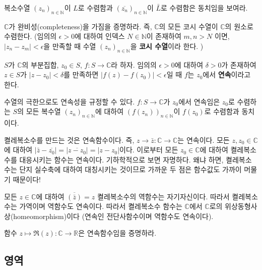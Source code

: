 \begin{salt_exercise} \label{ex-1-26}
복소수열 $(z_n)_{n\in\mathbb N}$이 $L$로 수렴함과
$(\overline{z_n})_{n\in\mathbb N}$이 $\bar L$로 수렴함은 동치임을 보여라.
\end{salt_exercise}

\begin{salt_exercise} \label{ex-1-27}
$\mathbb C$가 완비성(completeness)을 가짐을 증명하라.
즉, $\mathbb C$의 모든 코시 수열이 $\mathbb C$의 원소로 수렴한다.
(임의의 $\epsilon>0$에 대하여 인덱스 $N\in\mathbb N$이 존재하여
$m,n>N$ 이면, $|z_n - z_m| < \epsilon$을 만족할 때
수열 $(z_n)_{n\in\mathbb N}$을 {\bf 코시 수열}이라 한다.
)
\end{salt_exercise}

$S$가 $\mathbb C$의 부분집합, $z_0\in S$,  $f:S\to \mathbb C$라 하자.
임의의 $\epsilon>0$에 대하여 $\delta>0$가 존재하여
$z\in S$가 $|z-z_0|<\delta$를 만족하면 $|f(z)-f(z_0)|<\epsilon$일 때
$f$는 $z_0$에서 {\bf 연속}이라고 한다.

수열의 극한으로도 연속성을 규정할 수 있다.
$f:S\to\mathbb C$가 $z_0$에서 연속임은
$z_0$로 수렴하는 $S$의 모든 복수열 $(z_n)_{n\in\mathbb N}$에 대하여
$(f(z_n))_{n\in\mathbb N}$이 $f(z_0)$로 수렴함과 동치이다.

\begin{salt_example} \label{example-1-2}
켤레복소수를 만드는 것은 연속함수이다.
즉, $z\to\bar z: \mathbb C \to \mathbb C$는 연속이다.
모든 $z, z_0 \in \mathbb C$에 대하여
$|\bar z - \overline{z_0}| = |\overline{z-z_0}| = |z-z_0|$이다.
이로부터 모든 $z_0\in\mathbb C$에 대하여 켤레복소수를 대응시키는 함수는
연속이다. 기하학적으로 보면 자명하다. 왜냐 하면, 켤레복소수는 단지 실수축에 대하여 
대칭시키는 것이므로 가까운 두 점은 함수값도 가까이 머물기 때문이다!

모든 $z\in\mathbb C$에 대하여 $\overline{(\bar z)} = z$ 켤레복소수의
역함수는 자기자신이다. 따라서 켤레복소수는 가역이며 역함수도 연속이다.
따라서 켤레복소수 함수는 $\mathbb C$에서 $\mathbb C$로의 
위상동형사상(homeomorphism)이다 (연속인 전단사함수이며 역함수도 연속이다).
\end{salt_example}

\begin{salt_exercise} \label{ex-1-28}
함수 $z\mapsto \Re(z): \mathbb C \to \mathbb R$은 연속함수임을 증명하라. 
\end{salt_exercise}

\subsection{영역}

